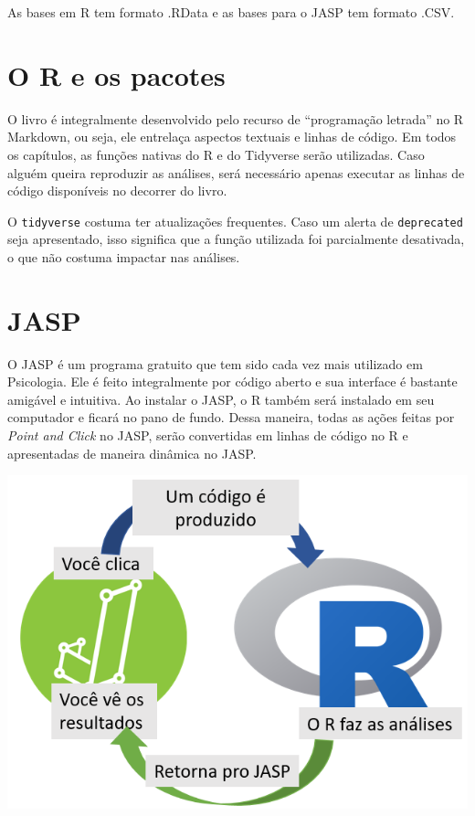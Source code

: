 \documentclass[
]{book}
\begin{document}
As bases em R tem formato .RData e as bases para o JASP tem formato
.CSV.

\hypertarget{o-r-e-os-pacotes}{%
\section{O R e os pacotes}\label{o-r-e-os-pacotes}}

O livro é integralmente desenvolvido pelo recurso de ``programação
letrada'' no R Markdown, ou seja, ele entrelaça aspectos textuais e
linhas de código. Em todos os capítulos, as funções nativas do R e do
Tidyverse serão utilizadas. Caso alguém queira reproduzir as análises,
será necessário apenas executar as linhas de código disponíveis no
decorrer do livro.

O \texttt{tidyverse} costuma ter atualizações frequentes. Caso um alerta
de \texttt{deprecated} seja apresentado, isso significa que a função
utilizada foi parcialmente desativada, o que não costuma impactar nas
análises.

\hypertarget{jasp}{%
\section{JASP}\label{jasp}}

O JASP é um programa gratuito que tem sido cada vez mais utilizado em
Psicologia. Ele é feito integralmente por código aberto e sua interface
é bastante amigável e intuitiva. Ao instalar o JASP, o R também será
instalado em seu computador e ficará no pano de fundo. Dessa maneira,
todas as ações feitas por \emph{Point and Click} no JASP, serão
convertidas em linhas de código no R e apresentadas de maneira dinâmica
no JASP.

\includegraphics{./img/capa_r_jasp.png}
\end{document}

